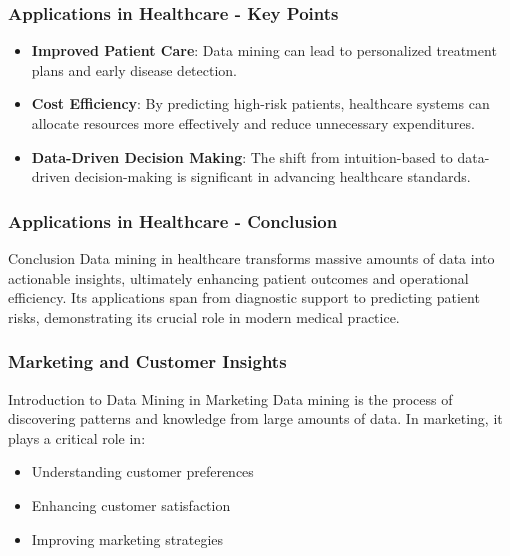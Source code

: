 \documentclass[aspectratio=169]{beamer}
\begin{document}
\begin{frame}[fragile]
    \frametitle{Applications in Healthcare - Key Points}
    \begin{itemize}
        \item \textbf{Improved Patient Care}: Data mining can lead to personalized treatment plans and early disease detection.
        \item \textbf{Cost Efficiency}: By predicting high-risk patients, healthcare systems can allocate resources more effectively and reduce unnecessary expenditures.
        \item \textbf{Data-Driven Decision Making}: The shift from intuition-based to data-driven decision-making is significant in advancing healthcare standards.
    \end{itemize}
\end{frame}

\begin{frame}[fragile]
    \frametitle{Applications in Healthcare - Conclusion}
    \begin{block}{Conclusion}
        Data mining in healthcare transforms massive amounts of data into actionable insights, ultimately enhancing patient outcomes and operational efficiency. Its applications span from diagnostic support to predicting patient risks, demonstrating its crucial role in modern medical practice.
    \end{block}
\end{frame}

\begin{frame}[fragile]
    \frametitle{Marketing and Customer Insights}
    \begin{block}{Introduction to Data Mining in Marketing}
        Data mining is the process of discovering patterns and knowledge from large amounts of data. 
        In marketing, it plays a critical role in:
        \begin{itemize}
            \item Understanding customer preferences
            \item Enhancing customer satisfaction
            \item Improving marketing strategies
        \end{itemize}
    \end{block}
\end{frame}
\end{document}
